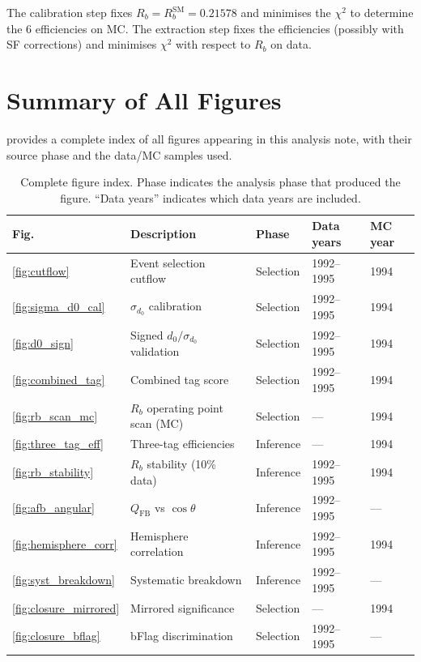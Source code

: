 \documentclass[11pt,a4paper]{article}
\begin{document}
The calibration step fixes $R_b = R_b^\text{SM} = 0.21578$ and
minimises the $\chi^2$ to determine the 6 efficiencies on MC.
The extraction step fixes the efficiencies (possibly with
SF corrections) and minimises $\chi^2$ with respect to $R_b$
on data.

\section{Summary of All Figures}
\label{app:figure_summary}

 provides a complete index of all
figures appearing in this analysis note, with their source phase
and the data/MC samples used.

\begin{table}[htbp]
\centering
\caption{Complete figure index. Phase indicates the analysis phase
that produced the figure. ``Data years'' indicates which data years
are included.}
\label{tbl:figure_summary}
\begin{tabular}{p{1.0cm}p{5.5cm}p{2.0cm}p{2.5cm}p{2.0cm}}
\toprule
Fig.\ & Description & Phase & Data years & MC year \\
\midrule
\ref{fig:cutflow} & Event selection cutflow & Selection & 1992--1995 & 1994 \\
\ref{fig:sigma_d0_cal} & $\sigma_{d_0}$ calibration & Selection & 1992--1995 & 1994 \\
\ref{fig:d0_sign} & Signed $d_0/\sigma_{d_0}$ validation & Selection & 1992--1995 & 1994 \\
\ref{fig:combined_tag} & Combined tag score & Selection & 1992--1995 & 1994 \\
\ref{fig:rb_scan_mc} & $R_b$ operating point scan (MC) & Selection & --- & 1994 \\
\ref{fig:three_tag_eff} & Three-tag efficiencies & Inference & --- & 1994 \\
\ref{fig:rb_stability} & $R_b$ stability (10\% data) & Inference & 1992--1995 & 1994 \\
\ref{fig:afb_angular} & $Q_\text{FB}$ vs $\cos\theta$ & Inference & 1992--1995 & --- \\
\ref{fig:hemisphere_corr} & Hemisphere correlation & Inference & 1992--1995 & 1994 \\
\ref{fig:syst_breakdown} & Systematic breakdown & Inference & 1992--1995 & --- \\
\ref{fig:closure_mirrored} & Mirrored significance & Selection & --- & 1994 \\
\ref{fig:closure_bflag} & bFlag discrimination & Selection & 1992--1995 & --- \\

\end{tabular}
\end{table}
\end{document}
